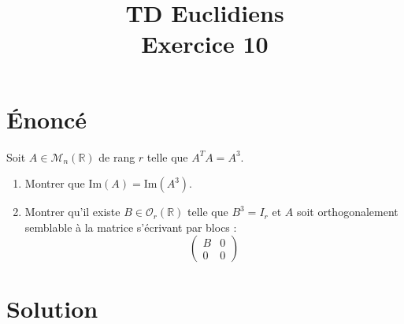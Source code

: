 \documentclass[french]{article}
\title{TD Euclidiens\\ Exercice 10}
\date{}
\newcommand{\R}{\mathbb{R}}
\begin{document}
\maketitle

\section{Énoncé}
Soit $A\in\mathcal{M}_n(\R)$ de rang $r$ telle que $A^TA=A^3$.
\begin{enumerate}
	\item Montrer que $\text{Im}(A)=\text{Im}(A^3)$.
	\item Montrer qu'il existe $B\in\mathcal{O}_r(\R)$ telle que $B^3=I_r$ et $A$ soit orthogonalement semblable à la matrice s'écrivant par blocs : $$\begin{pmatrix}
		B&0\\
		0&0
	\end{pmatrix}$$
\end{enumerate}
\section{Solution}
\end{document}
